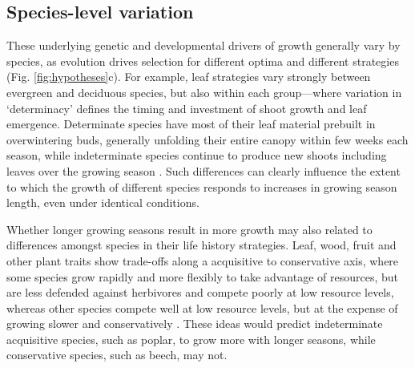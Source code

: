 \documentclass[11pt]{article}
\begin{document}
\subsection{Species-level variation}
These underlying genetic and developmental drivers of growth generally vary by species, as evolution drives selection for different optima and different strategies (Fig. \ref{fig:hypotheses}c). For example, leaf strategies vary strongly between evergreen and deciduous species, but also within each group---where variation in `determinacy' defines the timing and investment of shoot growth and leaf emergence. Determinate species have most of their leaf material prebuilt in overwintering buds, generally unfolding their entire canopy within few weeks each season, while indeterminate species continue to produce new shoots including leaves over the growing season \citep{kikuzawa1982leaf,Lechowicz:1984cr}. Such differences can clearly influence the extent to which the growth of different species responds to increases in growing season length, even under identical conditions.

Whether longer growing seasons result in more growth may also related to differences amongst species in their life history strategies. Leaf, wood, fruit and other plant traits show trade-offs along a acquisitive to conservative axis, where some species grow rapidly and more flexibly to take advantage of resources, but are less defended against herbivores and compete poorly at low resource levels, whereas other species compete well at low resource levels, but at the expense of growing slower and conservatively \citep[][]{Grime:1977sw,diaz2016}. These ideas would predict indeterminate acquisitive species, such as poplar, to grow more with longer seasons, while conservative species, such as beech, may not.  
\end{document}
